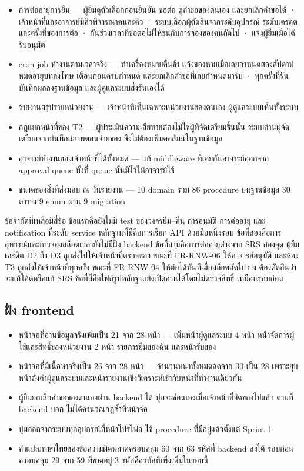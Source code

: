 \begin{itemize}
 \item การต่ออายุการยืม — ผู้ยืมดูตัวเลือกก่อนยืนยัน ขอต่อ ดูคำขอของตนเอง และยกเลิกคำขอได้ · เจ้าหน้าที่และอาจารย์มีคิวพิจารณาคนละคิว · ระบบเลือกผู้ตัดสินจากระดับอุปกรณ์ ระดับเครดิต และครั้งที่ของการต่อ · กันช่วงเวลาที่ขอต่อไม่ให้ชนกับการจองของคนถัดไป · แจ้งผู้ยืมเมื่อได้รับอนุมัติ
 \item cron job ทำงานตามเวลาจริง — ทำเครื่องหมายคืนช้า แจ้งของหายเมื่อเลยกำหนดสองสัปดาห์ หมดอายุบทลงโทษ เตือนก่อนครบกำหนด และยกเลิกคำขอที่เลยกำหนดมารับ · ทุกครั้งที่รันบันทึกผลลงฐานข้อมูล และผู้ดูแลระบบสั่งรันเองได้
 \item รายงานสรุปรายหน่วยงาน — เจ้าหน้าที่เห็นเฉพาะหน่วยงานของตนเอง ผู้ดูแลระบบเห็นทั้งระบบ
 \item กฎแยกหน้าที่ของ T2 — ผู้ประเมินความเสียหายต้องไม่ใช่ผู้ที่จัดเตรียมชิ้นนั้น ระบบอ่านผู้จัดเตรียมจากบันทึกสภาพตอนจ่ายของ จึงไม่ต้องเพิ่มคอลัมน์ในฐานข้อมูล
 \item อาจารย์ทำงานของเจ้าหน้าที่ได้ทั้งหมด — แก้ middleware ที่เคยกันอาจารย์ออกจาก approval queue ทั้งที่ queue นั้นมีไว้ให้อาจารย์ใช้
 \item ขนาดของสิ่งที่ส่งมอบ ณ วันรายงาน — 10 domain รวม 86 procedure บนฐานข้อมูล 30 ตาราง 9 enum ผ่าน 9 migration
\end{itemize}

ข้อจำกัดที่เหลือมีสี่ข้อ ข้อแรกคือยังไม่มี test ของวงจรยืม–คืน การอนุมัติ การต่ออายุ และ notification ที่ระดับ service หลักฐานที่มีคือการเรียก API ด้วยมือหนึ่งรอบ ข้อที่สองคือการอุทธรณ์และการจองสล็อตเวลายังไม่มีฝั่ง backend ข้อที่สามคือการต่ออายุต่างจาก SRS สองจุด ผู้ยืมเครดิต D2 ถึง D3 ถูกส่งไปให้เจ้าหน้าที่ตรวจของ ขณะที่ FR-RNW-06 ให้อาจารย์อนุมัติ และห้อง T3 ถูกส่งให้เจ้าหน้าที่ทุกครั้ง ขณะที่ FR-RNW-04 ให้ต่อได้ทันทีเมื่อสล็อตถัดไปว่าง ต้องตัดสินว่าจะแก้โค้ดหรือแก้ SRS ข้อที่สี่คือไฟล์รูปหลักฐานยังเปิดอ่านได้โดยไม่ตรวจสิทธิ์ เหมือนรอบก่อน

\subsection{ฝั่ง frontend}

\begin{itemize}
 \item หน้าจอที่อ่านข้อมูลจริงเพิ่มเป็น 21 จาก 28 หน้า — เพิ่มหน้าผู้ดูแลระบบ 4 หน้า หน้าจัดการผู้ใช้และสิทธิ์ของหน่วยงาน 2 หน้า รายการยืมของฉัน และหน้ารับของ
 \item หน้าจอที่มีเนื้อหาจริงเป็น 26 จาก 28 หน้า — จำนวนหน้าทั้งหมดลดจาก 30 เป็น 28 เพราะยุบหน้าตั้งค่าผู้ดูแลระบบและหน้ารายงานเชิงวิเคราะห์เข้ากับหน้าที่ทำงานเดียวกัน
 \item ผู้ยืมยกเลิกคำขอของตนเองผ่าน backend ได้ ปุ่มจะซ่อนเองเมื่อเจ้าหน้าที่จัดของไปแล้ว ตามที่ backend บอก ไม่ได้คำนวณกฎซ้ำที่หน้าจอ
 \item ปุ่มออกจากระบบทุกอุปกรณ์ที่หน้าโปรไฟล์ ใช้ procedure ที่มีอยู่แล้วตั้งแต่ Sprint 1
 \item คำแปลภาษาไทยของข้อความผิดพลาดครอบคลุม 60 จาก 63 รหัสที่ backend ส่งได้ รอบก่อนครอบคลุม 29 จาก 59 ที่ขาดอยู่ 3 รหัสคือรหัสที่เพิ่งเพิ่มในรอบนี้
\end{itemize}

